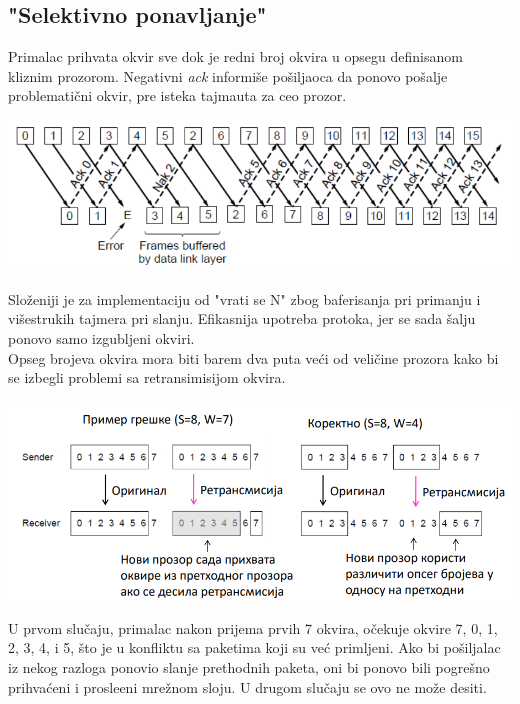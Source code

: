 \documentclass{article} %
\begin{document}
\subsection{"Selektivno ponavljanje"}

Primalac prihvata okvir sve dok je redni broj okvira u opsegu definisanom kliznim prozorom. Negativni \textit{ack} informi\v{s}e po\v{s}iljaoca da ponovo po\v{s}alje problemati\v{c}ni okvir, pre isteka tajmauta za ceo prozor.

\begin{center}
\includegraphics[scale=0.4]{selektivno-ponavljanje}
\end{center}
Slo\v{z}eniji je za implementaciju od "vrati se N" zbog baferisanja pri primanju i vi\v{s}estrukih tajmera pri slanju. Efikasnija upotreba protoka, jer se sada \v{s}alju ponovo samo izgubljeni okviri.\\
Opseg brojeva okvira mora biti barem dva puta ve\'{c}i od veli\v{c}ine prozora kako bi se izbegli problemi sa retransimisijom okvira.

\begin{center}
\includegraphics[scale=0.4]{selektivno-zahtevi}
\end{center}

U prvom slu\v{c}aju, primalac nakon prijema prvih 7 okvira, o\v{c}ekuje okvire 7, 0, 1, 2, 3, 4, i 5, \v{s}to je u konfliktu sa paketima koji su ve\'{c} primljeni. Ako bi po\v{s}iljalac iz nekog razloga ponovio slanje prethodnih paketa, oni bi ponovo bili pogre\v{s}no prihva\'{c}eni i prosle\dj{}eni mre\v{z}nom sloju. U drugom slu\v{c}aju se ovo ne mo\v{z}e desiti.
\end{document}
